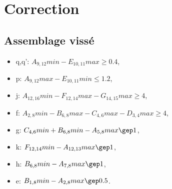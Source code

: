 




\clearpage

\ifdef{\public}{}{}

\newpage

\pagestyle{correction}

\section{Correction}

\subsection{Assemblage vissé}

\begin{itemize}
 \item q,q': $A_{9,12}min-E_{10,11}max\geq 0.4$,
 \item p: $A_{9,12}max-E_{10,11}min\leq 1.2$,
 \item j: $A_{12,16}min-F_{12,14}max-G_{14,15}max\geq 4$,
 \item f: $A_{2,8}min-B_{6,8}max-C_{4,6}max-D_{3,4}max\geq 4$,
 \item g: $C_{4,6}min+B_{6,8}min-A_{5,8}max\gep 1$,
 \item k: $F_{12,14}min-A_{12,13}max\gep 1$,
 \item h: $B_{6,8}min-A_{7,8}max\gep 1$,
 \item e: $B_{1,8}min-A_{2,8}max\gep 0.5$.
\end{itemize}




